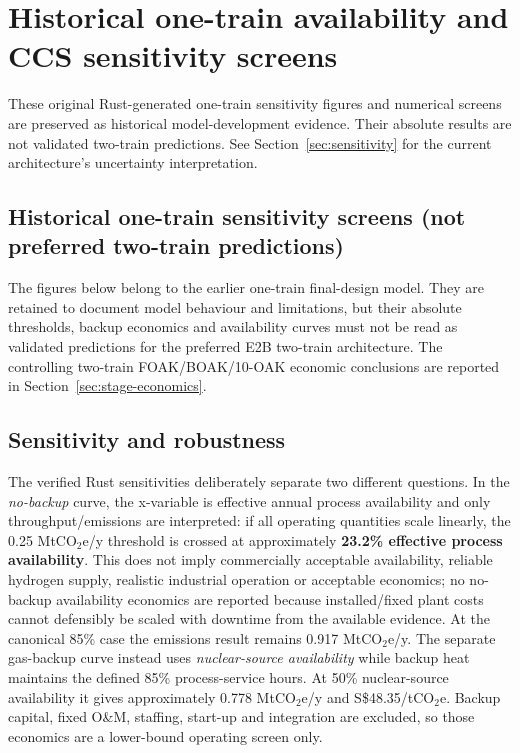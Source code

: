 \section{Historical one-train availability and CCS sensitivity screens}
\label{app:historical-sensitivity}
These original Rust-generated one-train sensitivity figures and numerical screens are preserved as historical model-development evidence. Their absolute results are not validated two-train predictions. See Section~\ref{sec:sensitivity} for the current architecture's uncertainty interpretation.

\subsection{Historical one-train sensitivity screens (not preferred two-train predictions)}
The figures below belong to the earlier one-train final-design model. They are retained to document model behaviour and limitations, but their absolute thresholds, backup economics and availability curves must not be read as validated predictions for the preferred E2B two-train architecture. The controlling two-train FOAK/BOAK/10-OAK economic conclusions are reported in Section~\ref{sec:stage-economics}.

\subsection{Sensitivity and robustness}
The verified Rust sensitivities deliberately separate two different questions.  In the \emph{no-backup} curve, the x-variable is effective annual process availability and only throughput/emissions are interpreted: if all operating quantities scale linearly, the 0.25 MtCO$_2$e/y threshold is crossed at approximately \textbf{23.2\% effective process availability}.  This does not imply commercially acceptable availability, reliable hydrogen supply, realistic industrial operation or acceptable economics; no no-backup availability economics are reported because installed/fixed plant costs cannot defensibly be scaled with downtime from the available evidence.  At the canonical 85\% case the emissions result remains 0.917 MtCO$_2$e/y.  The separate gas-backup curve instead uses \emph{nuclear-source availability} while backup heat maintains the defined 85\% process-service hours.  At 50\% nuclear-source availability it gives approximately 0.778 MtCO$_2$e/y and S\$48.35/tCO$_2$e.  Backup capital, fixed O\&M, staffing, start-up and integration are excluded, so those economics are a lower-bound operating screen only.

